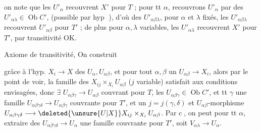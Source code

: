 
on note que les $U'_\alpha$ recouvrent $X'$ pour $T$ ;  pour tt $\alpha$, recouvrons  $U'_\alpha$ par des $U'_{\alpha\lambda}\in\operatorname{Ob}C'$, (possible par hyp \textcircled{}), d'où des $U'_{\alpha\beta\lambda}$, pour $\alpha$ et $\lambda$ fixés, les $U'_{\alpha\beta\lambda}$ recouvrent $U'_{\alpha\beta}$ pour $T'$ ;  de plus pour $\alpha,\lambda$ variables, les $U'_{\alpha\lambda}$ recouvrent $X'$ pour $T'$, par transitivité OK.

Axiome  de transitivité, On construit


grâce à l'hyp.  $X_i\longrightarrow X$  des $U_\alpha,U_{\alpha\beta}$, et pour tout $\alpha,\beta$ un $U_{\alpha\beta}\longrightarrow X_i$,  alors par le point  de voir, la famille des $X_{ij}\times_{X_i} U_{\alpha\beta}$ ($j$ variable) satisfait aux conditions envisagées, donc $\exists$ $U_{\alpha\beta\gamma}\longrightarrow U_{\alpha\beta}$ couvrant pour $T$, les $U_{\alpha\beta\gamma}\in\operatorname{Ob}C'$, et  tt $\gamma$ une famille $U_{\alpha\beta\gamma\delta}\longrightarrow U_{\alpha\beta\gamma}$ couvrante pour $T'$, et un $j=j(\gamma,\delta)$ et $U_{\alpha\beta}$-morphisme $U_{\alpha\beta\gamma\delta}\longrightarrow \deleted{\unsure{U|X}}X_{ij}\times_{X_i}U_{\alpha\beta}$. Par \textcircled{c}, on peut pour tt $\alpha$, extraire des $U_{\alpha\beta\gamma\delta}\longrightarrow U_\alpha$ une famille couvrante pour $T'$, soit $V_{\alpha\lambda}\longrightarrow U_\alpha$.

